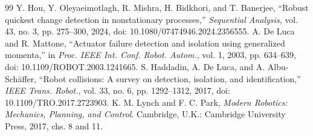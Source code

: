 \begin{thebibliography}{99}
 Y. Hou, Y. Oleyaeimotlagh, R. Mishra, H. Bidkhori, and T. Banerjee, ``Robust quickest change detection in nonstationary processes,'' \emph{Sequential Analysis}, vol. 43, no. 3, pp. 275--300, 2024, doi: 10.1080/07474946.2024.2356555.
 A. De Luca and R. Mattone, ``Actuator failure detection and isolation using generalized momenta,'' in \emph{Proc. IEEE Int. Conf. Robot. Autom.}, vol. 1, 2003, pp. 634--639, doi: 10.1109/ROBOT.2003.1241665.
 S. Haddadin, A. De Luca, and A. Albu-Sch\"affer, ``Robot collisions: A survey on detection, isolation, and identification,'' \emph{IEEE Trans. Robot.}, vol. 33, no. 6, pp. 1292--1312, 2017, doi: 10.1109/TRO.2017.2723903.
 K. M. Lynch and F. C. Park, \emph{Modern Robotics: Mechanics, Planning, and Control}. Cambridge, U.K.: Cambridge University Press, 2017, chs. 8 and 11.
\end{thebibliography}
